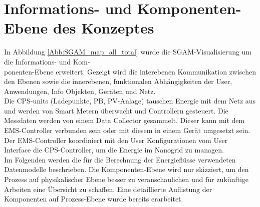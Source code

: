 
			
					
			
	\section{Informations- und Komponenten-Ebene des Konzeptes}
	\label{Kap:Konzept_comp}
		In Abbildung \ref{Abb:SGAM_map_all_total} wurde die SGAM-Visualisierung um die Informations- und Kom-\\ponenten-Ebene erweitert. Gezeigt wird die interebenen Kommunikation zwischen den Ebenen sowie die innerebenen, funktionalen Abhängigkeiten der User, Anwendungen, Info Objekten, Geräten und Netz. \\
		
		Die CPS-units (Ladepunkte, PB, PV-Anlage) tauschen Energie mit dem Netz aus und werden von Smart Metern überwacht und Controllern gesteuert. Die Messdaten werden von einem Data Collector gesammelt. Dieser kann mit dem EMS-Controller verbunden sein oder mit diesem in einem Gerät umgesetzt sein. Der EMS-Controller koordiniert mit den User Konfigurationen vom User Interface die CPS-Controller, um die Energie im Nanogrid zu managen. \\
		
		Im Folgenden werden die für die Berechnung der Energieflüsse verwendeten Datenmodelle beschrieben. Die Komponenten-Ebene wird nur skizziert, um den Prozess auf physikalischer Ebene besser zu veranschaulichen und für zukünftige Arbeiten eine Übersicht zu schaffen. Eine detaillierte Auflistung der Komponenten auf Prozess-Ebene wurde bereits erarbeitet. \cite{BA_Chris_Ong_2017}
	


